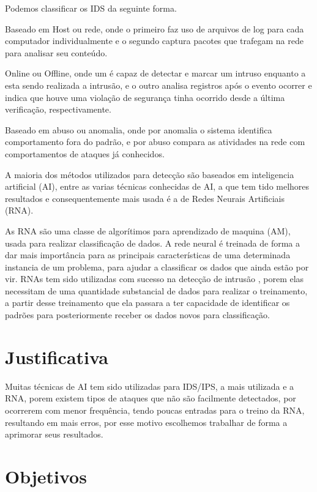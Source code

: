 Podemos classificar os IDS da seguinte forma.

Baseado em Host ou rede, onde o primeiro faz uso de arquivos de log para cada computador individualmente e o segundo captura pacotes que trafegam na rede para analisar seu conteúdo.

Online ou Offline, onde um é capaz de detectar e marcar um intruso enquanto a esta sendo realizada a intrusão, e o outro analisa registros após o evento ocorrer e indica que houve uma violação de segurança tinha ocorrido desde a última verificação, respectivamente.

Baseado em abuso ou anomalia, onde por anomalia o sistema identifica comportamento fora do padrão, e por abuso compara as atividades na rede com comportamentos de ataques já conhecidos.

A maioria dos métodos utilizados para detecção são baseados em inteligencia artificial (AI), entre as varias técnicas conhecidas de AI, a que tem tido melhores resultados e consequentemente mais usada é a de Redes Neurais Artificiais (RNA)\cite{Jake-Ryan}\cite{Stampar}.

As RNA são uma classe de algorítimos para aprendizado de maquina (AM), usada para realizar classificação de dados. A rede neural é treinada de forma a dar mais importância para as principais características de uma determinada instancia de um problema, para ajudar a classificar os dados que ainda estão por vir. 
RNAs tem sido utilizadas com sucesso na detecção de intrusão \cite{Zhang} \cite{Tong} \cite{Wonil}, porem elas necessitam de uma quantidade substancial de dados para realizar o treinamento, a partir desse treinamento que ela passara a ter capacidade de identificar os padrões para posteriormente receber os dados novos para classificação.




\section{Justificativa}

Muitas técnicas de AI tem sido utilizadas para IDS/IPS, a mais utilizada e a RNA\cite{Stampar}, porem existem tipos de ataques que não são facilmente detectados, por ocorrerem com menor frequência, tendo poucas entradas para o treino da RNA\cite{CeC}, resultando em mais erros,  por esse motivo escolhemos trabalhar de forma a aprimorar seus resultados. 


\section{Objetivos}

